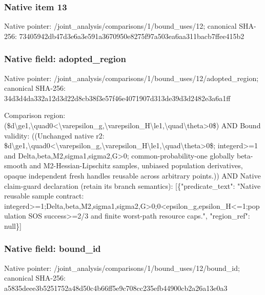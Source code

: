 \documentclass[10pt,a4paper]{article}
\begin{document}
\subsubsection{Native item 13}
Native pointer: /joint\_\allowbreak{}analysis/comparisons/1/bound\_\allowbreak{}uses/12; canonical SHA-256: 73405942db47d3e6a3e591a3670950e8275f97a503ea6aa311bacb7ffee415b2

\subsubsection{Native field: adopted\_\allowbreak{}region}
Native pointer: /joint\_\allowbreak{}analysis/comparisons/1/bound\_\allowbreak{}uses/12/adopted\_\allowbreak{}region; canonical SHA-256: 34d3d4da332a12d3d22d8cb38f3e57f46e4071907d313de39d3d2482e3a6a1ff

\begingroup\raggedright\sloppy Comparison region:\allowbreak{} (\$d\textbackslash{}ge1,\allowbreak{}\textbackslash{}quad0<\textbackslash{}varepsilon\_\allowbreak{}g,\allowbreak{}\textbackslash{}varepsilon\_\allowbreak{}H\textbackslash{}le1,\allowbreak{}\textbackslash{}quad\textbackslash{}theta>0\$) AND Bound validity:\allowbreak{} ((Unchanged native r2:\allowbreak{} \$d\textbackslash{}ge1,\allowbreak{}\textbackslash{}quad0<\textbackslash{}varepsilon\_\allowbreak{}g,\allowbreak{}\textbackslash{}varepsilon\_\allowbreak{}H\textbackslash{}le1,\allowbreak{}\textbackslash{}quad\textbackslash{}theta>0\$;\allowbreak{} integerd>=\allowbreak{}1 and Delta,\allowbreak{}beta,\allowbreak{}M2,\allowbreak{}sigma1,\allowbreak{}sigma2,\allowbreak{}G>0;\allowbreak{} common-probability-one globally beta-smooth and M2-Hessian-Lipschitz samples,\allowbreak{} unbiased population derivatives,\allowbreak{} opaque independent fresh handles reusable across arbitrary points.)) AND Native claim-guard declaration (retain its branch semantics):\allowbreak{} [\{"predicate\_\allowbreak{}text":\allowbreak{} "Native reusable sample contract:\allowbreak{} integerd>=\allowbreak{}1;\allowbreak{}Delta,\allowbreak{}beta,\allowbreak{}M2,\allowbreak{}sigma1,\allowbreak{}sigma2,\allowbreak{}G>0;\allowbreak{}0<epsilon\_\allowbreak{}g,\allowbreak{}epsilon\_\allowbreak{}H<=\allowbreak{}1;\allowbreak{}population SOS success>=\allowbreak{}2/\allowbreak{}3 and finite worst-path resource caps.",\allowbreak{} "region\_\allowbreak{}ref":\allowbreak{} null\}]\par\endgroup

\subsubsection{Native field: bound\_\allowbreak{}id}
Native pointer: /joint\_\allowbreak{}analysis/comparisons/1/bound\_\allowbreak{}uses/12/bound\_\allowbreak{}id; canonical SHA-256: a5835deee3b5251752a48d50c4b66ff5e9c708cc235efb44900cb2a26a13e0a3
\end{document}
